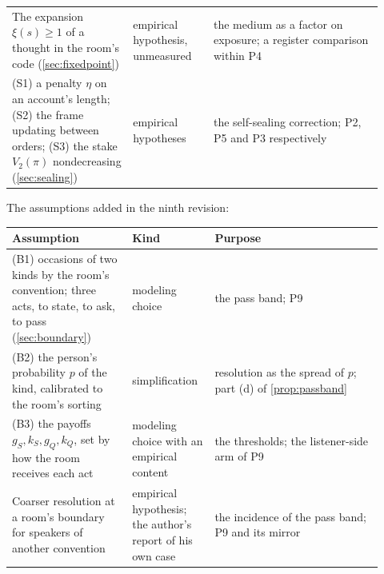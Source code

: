 \begin{center}
\begin{tabular}{p{0.3\linewidth} p{0.2\linewidth} p{0.42\linewidth}}
The expansion $\xi(s) \ge 1$ of a thought in the room's code (\autoref{sec:fixedpoint}) & empirical hypothesis, unmeasured & the medium as a factor on exposure; a register comparison within P4 \\
(S1) a penalty $\eta$ on an account's length; (S2) the frame updating between orders; (S3) the stake $V_2(\pi)$ nondecreasing (\autoref{sec:sealing}) & empirical hypotheses & the self-sealing correction; P2, P5 and P3 respectively \\
\bottomrule
\end{tabular}
\end{center}

\noindent The assumptions added in the ninth revision:
\begin{center}\small
\begin{tabular}{p{0.3\linewidth} p{0.2\linewidth} p{0.42\linewidth}}
\toprule
Assumption & Kind & Purpose \\
\midrule
(B1) occasions of two kinds by the room's convention; three acts, to state, to ask, to pass (\autoref{sec:boundary}) & modeling choice & the pass band; P9 \\
(B2) the person's probability $p$ of the kind, calibrated to the room's sorting & simplification & resolution as the spread of $p$; part (d) of \autoref{prop:passband} \\
(B3) the payoffs $g_S, k_S, g_Q, k_Q$, set by how the room receives each act & modeling choice with an empirical content & the thresholds; the listener-side arm of P9 \\
Coarser resolution at a room's boundary for speakers of another convention & empirical hypothesis; the author's report of his own case & the incidence of the pass band; P9 and its mirror \\
\bottomrule
\end{tabular}
\end{center}

